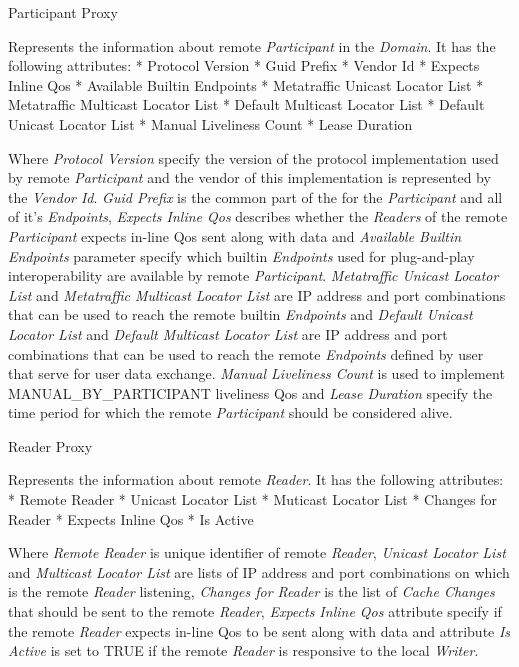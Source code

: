 \secc Participant Proxy

Represents the information about remote {\em Participant} in the {\em Domain}. It has the following attributes:
\begitems
* Protocol Version
* Guid Prefix
* Vendor Id
* Expects Inline Qos
* Available Builtin Endpoints
* Metatraffic Unicast Locator List
* Metatraffic Multicast Locator List
* Default Multicast Locator List
* Default Unicast Locator List
* Manual Liveliness Count
* Lease Duration
\enditems

Where {\em Protocol Version} specify the version of the  protocol implementation used by remote {\em Participant} and the vendor of this implementation is represented by the {\em Vendor Id}. {\em Guid Prefix} is the common part of the  for the {\em Participant} and all of it's {\em Endpoints}, {\em Expects Inline Qos} describes whether the {\em Readers} of the remote {\em Participant} expects in-line Qos sent along with data and {\em Available Builtin Endpoints} parameter specify which builtin {\em Endpoints} used for plug-and-play interoperability are available by remote {\em Participant}. {\em Metatraffic Unicast Locator List} and {\em Metatraffic Multicast Locator List} are IP address and port combinations that can be used to reach the remote builtin {\em Endpoints} and {\em Default Unicast Locator List} and {\em Default Multicast Locator List} are IP address and port combinations that can be used to reach the remote {\em Endpoints} defined by user that serve for user data exchange. {\em Manual Liveliness Count} is used to implement MANUAL\_BY\_PARTICIPANT liveliness Qos and {\em Lease Duration} specify the time period for which the remote {\em Participant} should be considered alive.

\secc Reader Proxy

Represents the information about remote {\em Reader}. It has the following attributes:
\begitems
* Remote Reader 
* Unicast Locator List
* Muticast Locator List
* Changes for Reader
* Expects Inline Qos
* Is Active
\enditems

Where {\em Remote Reader } is unique identifier of remote {\em Reader}, {\em Unicast Locator List} and {\em Multicast Locator List} are lists of IP address and port combinations on which is the remote {\em Reader} listening, {\em Changes for Reader} is the list of {\em Cache Changes} that should be sent to the remote {\em Reader}, {\em Expects Inline Qos} attribute specify if the remote {\em Reader} expects in-line Qos to be sent along with data and attribute {\em Is Active} is set to TRUE if the remote {\em Reader} is responsive to the local {\em Writer}.

